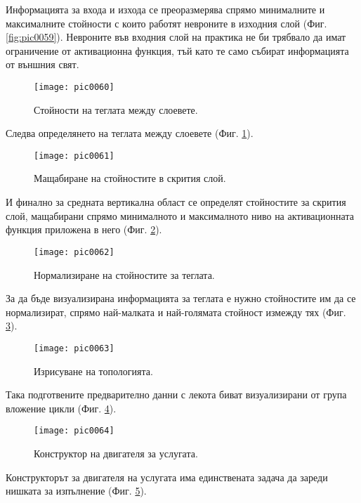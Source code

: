 Информацията за входа и изхода се преоразмерява спрямо минималните и максималните стойности с които работят невроните в изходния слой (Фиг. \ref{fig:pic0059}). Невроните във входния слой на практика не би трябвало да имат ограничение от активационна функция, тъй като те само събират информацията от външния свят. 

\begin{figure}[h]
  \centering
  \texttt{[image: pic0060]}
  \caption{Стойности на теглата между слоевете.}
\label{fig:pic0060}
\end{figure}
\FloatBarrier

Следва определянето на теглата между слоевете (Фиг. \ref{fig:pic0060}).

\begin{figure}[h]
  \centering
  \texttt{[image: pic0061]}
  \caption{Мащабиране на стойностите в скрития слой.}
\label{fig:pic0061}
\end{figure}
\FloatBarrier

И финално за средната вертикална област се определят стойностите за скрития слой, мащабирани спрямо минималното и максималното ниво на активационната функция приложена в него (Фиг. \ref{fig:pic0061}).

\begin{figure}[h]
  \centering
  \texttt{[image: pic0062]}
  \caption{Нормализиране на стойностите за теглата.}
\label{fig:pic0062}
\end{figure}
\FloatBarrier

За да бъде визуализирана информацията за теглата е нужно стойностите им да се нормализират, спрямо най-малката и най-голямата стойност измежду тях (Фиг. \ref{fig:pic0062}).

\begin{figure}[h]
  \centering
  \texttt{[image: pic0063]}
  \caption{Изрисуване на топологията.}
\label{fig:pic0063}
\end{figure}
\FloatBarrier

Така подготвените предварително данни с лекота биват визуализирани от група вложение цикли (Фиг. \ref{fig:pic0063}).

\begin{figure}[h]
  \centering
  \texttt{[image: pic0064]}
  \caption{Конструктор на двигателя за услугата.}
\label{fig:pic0064}
\end{figure}
\FloatBarrier

Конструкторът за двигателя на услугата има единствената задача да зареди нишката за изпълнение (Фиг. \ref{fig:pic0064}).

